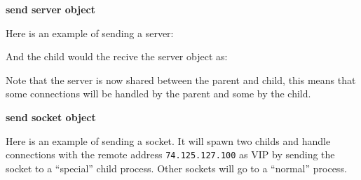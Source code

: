 \textbf{send server object}

Here is an example of sending a server:

\begin{Shaded}
\begin{Highlighting}[]
 \NormalTok{(}\NormalTok{);}

 \NormalTok{();}
\NormalTok{(}\NormalTok{, } 
  \NormalTok{(}\NormalTok{);}
\NormalTok{\});}
\NormalTok{(}\NormalTok{, }\NormalTok{() \{}
  \NormalTok{(}
\NormalTok{\});}
\end{Highlighting}
\end{Shaded}

And the child would the recive the server object as:

\begin{Shaded}
\begin{Highlighting}[]
\NormalTok{(}\NormalTok{, }
   \NormalTok{) \{}
    \NormalTok{(}\NormalTok{, } 
      \NormalTok{(}\NormalTok{);}
    \NormalTok{\});}
  \NormalTok{\}}
\NormalTok{\});}
\end{Highlighting}
\end{Shaded}

Note that the server is now shared between the parent and child, this
means that some connections will be handled by the parent and some by
the child.

\textbf{send socket object}

Here is an example of sending a socket. It will spawn two childs and
handle connections with the remote address \texttt{74.125.127.100} as
VIP by sending the socket to a ``special'' child process. Other sockets
will go to a ``normal'' process.

